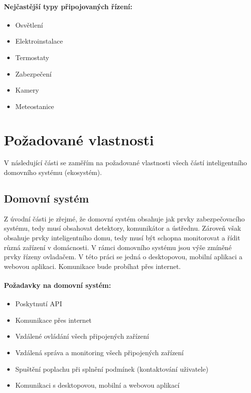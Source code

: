 \documentclass[FM,DP]{tulthesis}  %
\begin{document}
\paragraph{Nejčastější typy připojovaných řízení:}
\begin{itemize}
\item Osvětlení
\item Elektroinstalace
\item Termostaty
\item Zabezpečení
\item Kamery
\item Meteostanice
\end{itemize}


\section{Požadované vlastnosti}
V následující části se zaměřím na požadované vlastnosti všech částí inteligentního domovního systému (ekosystém).

\subsection{Domovní systém}
Z úvodní části je zřejmé, že domovní systém obsahuje jak prvky zabezpečovacího systému, tedy musí obsahovat detektory, komunikátor a ústřednu. Zároveň však obsahuje prvky inteligentního domu, tedy musí být schopna monitorovat a řídit různá zařízení v domácnosti. V rámci domovního systému jsou výše zmíněné prvky řízeny ovladačem. V této práci se jedná o desktopovou, mobilní aplikaci a webovou aplikaci. Komunikace bude probíhat přes internet.

\paragraph{Požadavky na domovní systém:}
\begin{itemize}
\item Poskytnutí API
\item Komunikace přes internet
\item Vzdálené ovládání všech připojených zařízení
\item Vzdálená správa a monitoring všech připojených zařízení
\item Spuštění poplachu při splnění podmínek (kontaktování uživatele)
\item Komunikaci s desktopovou, mobilní a webovou aplikací
\end{itemize}
\end{document}
